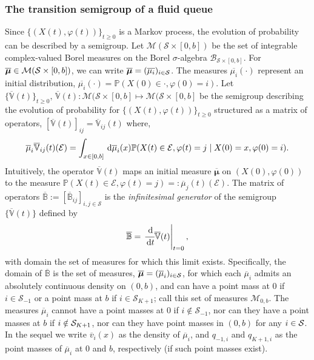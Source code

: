 \subsubsection{The transition semigroup of a fluid queue}
Since \(\{( X(t),\varphi(t))\}_{t\geq 0}\) is a Markov process, the evolution of probability can be described by a semigroup. Let $\mathcal{M}(\mathcal{S} \times [0,b])$ be the set of integrable complex-valued Borel measures on the Borel $\sigma$-algebra $\mathcal{B}_{\mathcal{S} \times [0,b]}$. For $\overline{\boldsymbol{\mu}} \in \mathcal{M}(\mathcal{S} \times [0,b])$, we can write \(\overline{\boldsymbol{\mu}} = (\overline{\mu_i})_{i \in \mathcal{S}}\). The measures \(\overline{\mu_i}(\cdot)\) represent an initial distribution, \(\overline{\mu_i}(\cdot) = \mathbb P(X(0)\in\cdot, \varphi(0) = i)\). 
Let \(\{\overline{\mathbb V}(t)\}_{t\geq 0},\, \overline{\mathbb V}(t):\mathcal{M}(\mathcal{S} \times [0,b]\mapsto \mathcal{M}(\mathcal{S} \times [0,b]\) be the semigroup describing the evolution of probability for \(\{(X(t),\varphi(t))\}_{t\geq 0}\) structured as a matrix of operators, \(\left[ \overline{\mathbb V}(t)\right]_{ij}= \overline{\mathbb V}_{ij}(t)\) where, 
\[\overline\mu_i \overline{ \mathbb V}_{ij}(t)(\mathcal{E}) = \int_{x\in[0,b]} \, \mathrm{d} \overline\mu_i(x)\mathbb P (X(t) \in\mathcal{E},\varphi(t) = j \mid X(0) = x, \varphi(0) = i).\]
Intuitively, the operator \( \overline{\mathbb V}(t)\) maps an initial measure \(\overline{\boldsymbol \mu}\) on \((X(0),\varphi(0))\) to the measure \(\mathbb P(X(t)\in \mathcal{E}, \varphi(t)=j)=:\overline\mu_j(t)(\mathcal{E})\). 
The matrix of operators \( \overline{\mathbb B}:=[\overline{\mathbb B}_{ij}]_{i,j\in\mathcal S}\) is the \textit{infinitesimal generator} of the semigroup \(\{ \overline{\mathbb V}(t)\}\) defined by 
\[ \overline{\mathbb B} =\left.\cfrac{\, \mathrm{d}}{\, \mathrm{d} t} \overline{\mathbb V}(t)\right|_{t=0},\]
with domain the set of measures for which this limit exists. Specifically, the domain of \(\overline{\mathbb B}\) is the set of measures, \(\overline{\boldsymbol \mu} = (\overline\mu_i)_{i\in\mathcal{S}}\), for which each \(\overline\mu_i\) admits an absolutely continuous density on \((0,b)\), and can have a point mass at \(0\) if \(i\in\mathcal S_{-1}\) or a point mass at \(b\) if \(i\in\mathcal S_{K+1}\); call this set of measures \(\mathcal M_{0,b}\). The measures \(\overline\mu_i\) cannot have a point masses at 0 if \(i\notin \mathcal S_{-1}\), nor can they have a point masses at \(b\) if \(i\notin\mathcal{S}_{{K+1}}\), nor can they have point masses in \((0,b)\) for any \(i\in\mathcal{S}\). In the sequel we write \(\overline v_i(x)\) as the density of \(\overline\mu_i\), and \(q_{{-1},i}\) and \(q_{{K+1},i}\) as the point masses of \(\overline\mu_i\) at \(0\) and \(b\), respectively (if such point masses exist). 

